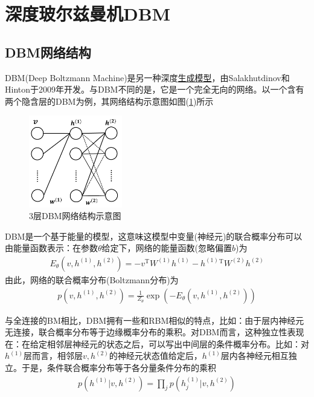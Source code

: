 \section{深度玻尔兹曼机DBM}
    \subsection{DBM网络结构}
        \par
        DBM(Deep Boltzmann Machine)是另一种深度\underline{生成模型}，由Salakhutdinov和Hinton于2009年开发。与DBM不同的是，它是一个完全无向的网络。以一个含有两个隐含层的DBM为例，其网络结构示意图如图(\ref{fig:3层DBM网络结构示意图})所示
            \begin{figure}[H]
            \centering
            \includegraphics[height=4cm]{images/3DBM_net_structure.jpg}
            \caption{3层DBM网络结构示意图}
            \label{fig:3层DBM网络结构示意图}
            \end{figure}
        DBM是一个基于能量的模型，这意味这模型中变量(神经元)的联合概率分布可以由能量函数表示：在参数$\theta$给定下，网络的能量函数(忽略偏置$b$)为
        \begin{align*}
        E_\theta(v,h^{(1)},h^{(2)}) = -v^\mathrm{T}W^{(1)}h^{(1)} - h^{(1)}{}^\mathrm{T} W^{(2)}h^{(2)}
        \end{align*}
        由此，网络的联合概率分布(Boltzmann分布)为
        \begin{align*}
        p(v,h^{(1)},h^{(2)}) = \frac{1}{Z_\theta} \exp \left( -E_\theta(v,h^{(1)},h^{(2)}) \right)
        \end{align*}
        \par
        与全连接的BM相比，DBM拥有一些和RBM相似的特点，比如：由于层内神经元无连接，联合概率分布等于边缘概率分布的乘积。对DBM而言，这种独立性表现在：在给定相邻层神经元的状态之后，可以写出中间层的条件概率分布。比如：对$h^{(1)}$层而言，相邻层$v,h^{(2)}$的神经元状态值给定后，$h^{(1)}$层内各神经元相互独立。于是，条件联合概率分布等于各分量条件分布的乘积
        \begin{align*}
        p \left( h^{(1)}|v,h^{(2)} \right)  = \prod _jp \left( h_j^{(1)}|v,h^{(2)} \right)
        \end{align*}
